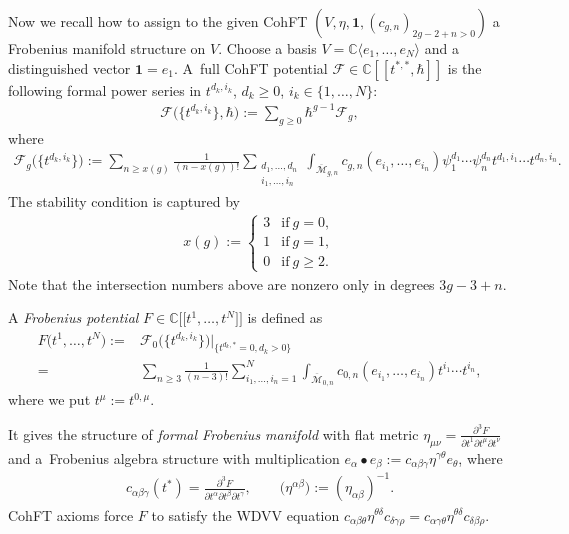 \documentclass[pdftex]{sigma}
\def\oM{\overline{\mathcal{M}}}
\numberwithin{equation}{section}
\begin{document}
Now we recall how to assign to the given CohFT $(V,\eta,\mathbf{1},(c_{g,n})_{2g-2+n>0})$ a Frobenius manifold structure on $V$. Choose a basis $V=\mathbb{C}\langle e_1,\dots, e_N\rangle$ and a distinguished vector $\mathbf{1} = e_1$.
A~full CohFT potential $\mathcal{F}\in \mathbb{C}[[t^{*,*},\hbar]]$ is the following formal power series in $t^{d_k,i_k}$, $d_k \geq 0$, $i_k \in \{1,\dots,N\}$:
\begin{align*}
 \mathcal{F}\big(\big\{t^{d_k,i_k}\big\},\hbar\big) := \sum_{g\geq0}\hbar^{g-1}\mathcal{F}_g,
\end{align*}
where
\begin{align*}
 \mathcal{F}_g\big(\big\{t^{d_k,i_k}\big\}\big) := \sum_{n\geq x(g)}\frac{1}{(n-x(g))!}\sum_{\substack{d_1,\dots,d_n \\ i_1,\dots,i_n}} \int_{\oM_{g,n}}c_{g,n}(e_{i_1},\dots,e_{i_n})\psi_1^{d_1}\cdots \psi_n^{d_n}t^{d_1,i_1}\cdots t^{d_n,i_n}.
\end{align*}
The stability condition is captured by{\samepage
\begin{align*}
x(g):=
\begin{cases}
3 & \text{if} \ g=0 ,\\
1 & \text{if} \ g=1 ,\\
0 & \text{if} \ g\geq 2 .
\end{cases}
\end{align*}
Note that the intersection numbers above are nonzero only in degrees $3g-3+n$.}


A \emph{Frobenius potential} $F \in \mathbb{C}\big[\big[t^1,\dots,t^N\big]\big]$ is defined as
\begin{align*}%
 F\big(t^1,\dots,t^N\big) :={}& \mathcal{F}_0\big(\big\{t^{d_k,i_k}\big\}\big)|_{\{t^{d_k,*}=0, d_k>0\}}\\
={}&
 \sum_{n\geq 3}\frac{1}{(n-3)!}\sum^N_{i_1,\dots,i_n=1} \int_{\oM_{0,n}}c_{0,n}(e_{i_1},\dots,e_{i_n}) t^{i_1}\cdots t^{i_n},
\end{align*}
where we put $t^{\mu}:=t^{0,\mu}$.

It gives the structure of \emph{formal Frobenius manifold} with flat metric
$
 \eta_{\mu\nu} = \frac{\partial^3 F}{\partial t^1\partial t^{\mu}\partial t^{\nu}}
$
and a~Frobenius algebra structure with multiplication $e_{\alpha} \bullet e_{\beta}:=c_{\alpha \beta \gamma}\eta^{\gamma \theta} e_{\theta}$, where
\begin{align*}
 c_{\alpha \beta \gamma}(t^*)= \frac{\partial^3 F}{\partial t^{\alpha}\partial t^{\beta}\partial t^{\gamma}}, \qquad \big(\eta^{\alpha\beta}\big):= (\eta_{\alpha\beta})^{-1}.
\end{align*}
CohFT axioms force $F$ to satisfy the WDVV equation
$
 c_{\alpha \beta \theta} \eta^{\theta\delta}
 c_{\delta \gamma \rho}=
 c_{\alpha \gamma \theta} \eta^{\theta\delta}
 c_{\delta \beta \rho}$.
\end{document}
